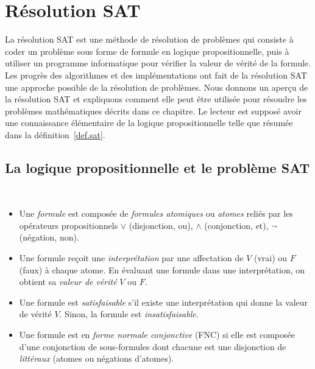 
\section{Résolution SAT }\label{s.sat}

La résolution SAT est une méthode de résolution de problèmes qui consiste à coder un problème sous forme de formule en logique propositionnelle, puis à utiliser un programme informatique pour vérifier la valeur de vérité de la formule. Les progrès des algorithmes et des implémentations ont fait de la résolution SAT une approche possible de la résolution de problèmes. Nous donnons un aperçu de la résolution SAT et expliquons comment elle peut être utilisée pour résoudre les problèmes mathématiques décrits dans ce chapitre. Le lecteur est supposé avoir une connaissance élémentaire de la logique propositionnelle telle que résumée dans la définition~\ref{def.sat}.

\subsection{La logique propositionnelle et le problème SAT}

\begin{definition}\label{def.sat}\mbox{}\\
\begin{itemize}
\item Une \emph{formule} est composée de \emph{formules atomiques} ou \emph{atomes} reliés par les opérateurs propositionnels $\vee$ (disjonction, \og ou\fg), $\wedge$ (conjonction, \og et\fg), $\neg$ (négation, \og non\fg).
\item Une formule reçoit une \emph{interprétation} par une affectation de $V$ (vrai) ou $F$ (faux) à chaque atome. En évaluant une formule dans une interprétation, on obtient sa \emph{valeur de vérité} $V$ ou $F$. 
\item Une formule est \emph{satisfaisable}  s'il existe une interprétation qui donne la  valeur de vérité $V$. Sinon, la formule est \emph{insatisfaisable}.
\item Une formule est en \emph{forme normale conjonctive} (FNC)  si elle est composée d'une conjonction de sous-formules dont chacune est une disjonction de \emph{littéraux}  (atomes ou négations d'atomes).
\end{itemize}
\end{definition}

